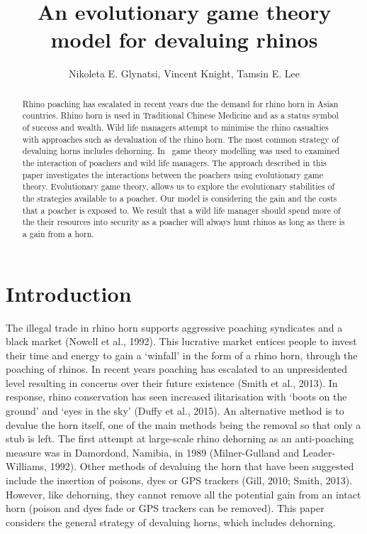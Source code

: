 \documentclass[10pt]{article}
\title{An evolutionary game theory model for devaluing rhinos}
\author{Nikoleta E. Glynatsi, Vincent Knight, Tamsin E. Lee} %
\date{}
\begin{document}

\maketitle

\begin{abstract}

Rhino poaching has escalated in recent years due the demand for rhino horn in 
Asian countries. Rhino horn is used in Traditional Chinese Medicine and as a 
status symbol of success and wealth. Wild life managers attempt to minimise
the rhino casualties with approaches such as devaluation of the rhino horn. 
The  most common strategy of devaluing horns includes dehorning. In~\cite{Lee}
game theory modelling was used to examined the interaction of poachers and
wild life managers. The approach described in this paper investigates the interactions 
between the poachers using evolutionary game theory. Evolutionary game theory,
allows us to explore the evolutionary stabilities of the strategies available to
a poacher. Our model is considering the gain and the costs that a poacher
is exposed to. We result that a wild life manager should spend more of the
their resources into security as a poacher will always hunt rhinos as long as there 
is a gain from a horn. 
\end{abstract}


\section{Introduction}\label{section:introduction}

The illegal trade in rhino horn supports aggressive poaching syndicates and a 
black market (Nowell et al., 1992). This lucrative market entices people to invest
their time and energy to gain a `winfall' in the form of a rhino horn, through the 
poaching of rhinos. In recent years poaching has escalated to an unpresidented 
level resulting in concerns over their future existence (Smith et al., 2013). In 
response, rhino conservation has seen increased  ilitarisation with `boots on the 
ground' and `eyes in the sky' (Duffy et al., 2015). An alternative method is to 
devalue the horn itself, one of the main  methods being the removal so that only
a stub is left. The first attempt at large-scale rhino dehorning as an anti-poaching
measure was in Damordond,  Namibia, in 1989 (Milner-Gulland and Leader-Williams,
1992). Other methods of devaluing the horn that have been suggested include
the insertion of poisons, dyes or GPS trackers (Gill, 2010; Smith, 2013). However, 
like dehorning, they cannot remove all the potential gain from an intact horn 
(poison and dyes fade or GPS trackers can be removed). This paper considers 
the general strategy of devaluing horns, which includes dehorning.
\end{document}
